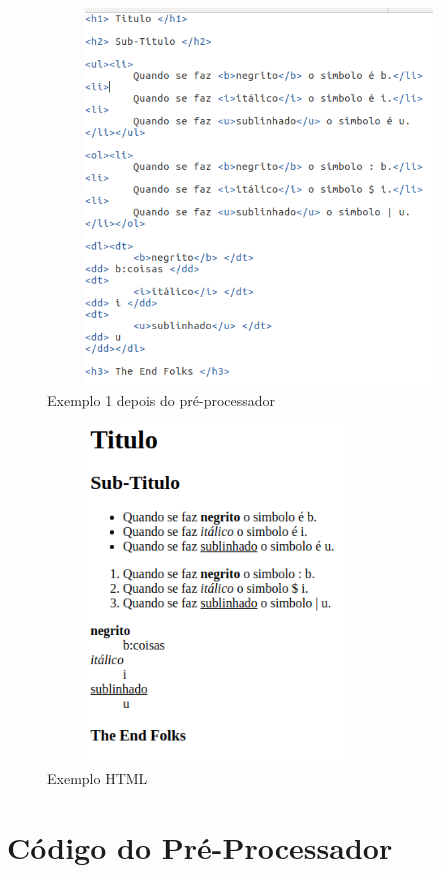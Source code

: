 \documentclass{report}
\begin{document}
\begin{figure}[h]
\centering
\includegraphics[width=12cm,height= 10cm]{exemplo1html.png}
\caption{Exemplo 1 depois do pré-processador}
\label{Ficheiro em HTML}
\end{figure}
\begin{figure}[h]
\centering
\includegraphics[width=9cm,height= 9cm]{HTML.png}
\caption{Exemplo HTML}
\label{HTML}
\end{figure}


\chapter{Código do Pré-Processador}
\end{document}
